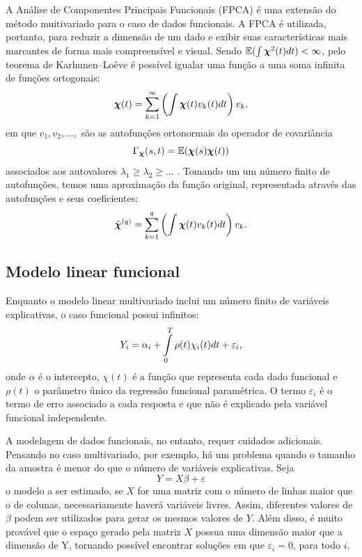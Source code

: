 \documentclass[
	12pt,				%
	openright,			%
	oneside,			%
	a4paper,			%
	english,			%
	brazil				%
	]{dissertacao-ufrgs-abntex2}
\begin{document}
A Análise de Componentes Principais Funcionais (FPCA) é uma extensão do método muitivariado para o caso de dados funcionais. 
A FPCA é utilizada, portanto, para reduzir a dimensão de um dado e exibir suas
características mais marcantes de forma mais compreensível e visual. Sendo
$\mathbb{E}(\int\boldsymbol{\chi}^{2}(t)dt)<\infty$, pelo teorema de Karhunen–Loève é possível igualar uma função a uma soma infinita de funções ortogonais:
\begin{equation}
\boldsymbol{\chi}(t)=\sum_{k=1}^{\text{\ensuremath{\infty}}}\left(\int\boldsymbol{\chi}(t)v_{k}(t)dt\right)v_{k},
\end{equation}
em que $v_{1},v_{2},...,$ são as autofunções ortonormais do operador de covariância
\begin{equation}
\Gamma_{\boldsymbol{\chi}}(s,t)=\mathbb{E}(\boldsymbol{\chi}(s)\boldsymbol{\chi}(t))
\end{equation}
associados aos autovalores $\lambda_{1}\geq\lambda_{2}\geq...$ .
Tomando um um número finito de autofunções, temos uma aproximação da função original, representada através das autofunções e seus coeficientes:
\begin{equation}
\tilde{\boldsymbol{\chi}}^{(q)}=\sum_{k=1}^{\text{\ensuremath{q}}}\left(\int\boldsymbol{\chi}(t)v_{k}(t)dt\right)v_{k}.
\end{equation}


\subsection{Modelo linear funcional}

Enquanto o modelo linear multivariado inclui um número finito de variáveis explicativas, o caso funcional possui infinitos:
\begin{equation}
Y_{i}=\alpha_{i}+\intop_{0}^{T}\rho(t)\chi_{i}(t)dt+\varepsilon_{i},\label{eq:modelofuncionallinear}
\end{equation}
onde $\alpha$ é o intercepto, $\chi(t)$ é a função que representa
cada dado funcional e $\rho(t)$ o parâmetro único da regressão funcional
paramétrica. O termo $\varepsilon_{i}$ é o termo de erro associado
a cada resposta e que não é explicado pela variável funcional
independente.

A modelagem de dados funcionais, no entanto, requer cuidados adicionais. Pensando no caso multivariado, por exemplo, há um problema quando
o tamanho da amostra é menor do que o número de variáveis explicativas.
Seja
\begin{equation}
Y=X\beta+\varepsilon
\end{equation}
o modelo a ser estimado, se $X$ for uma matriz com o número de linhas
maior que o de colunas, necessariamente haverá variáveis livres. Assim,
diferentes valores de $\beta$ podem ser utilizados para gerar os
mesmos valores de $Y$. Além disso, é muito provável que o espaço
gerado pela matriz $X$ possua uma dimensão maior que a dimensão de
Y, tornando possível encontrar soluções em que $\varepsilon_{i}=0$,
para todo $i$. 
\end{document}
